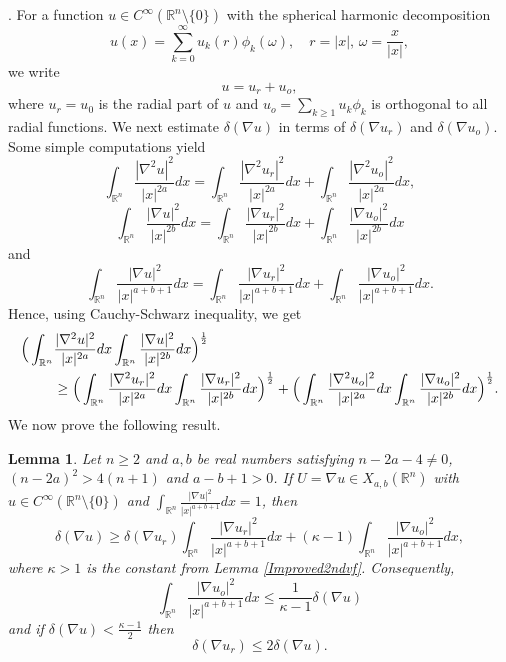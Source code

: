 \documentclass[a4paper,12pt]{article}
\theoremstyle{plain}
\newtheorem{lemma}[theorem]{Lemma}
\theoremstyle{definition}
\theoremstyle{remark}
\def\R{\mathbb R}%
\def\irn{\int_{\R^n}}
\numberwithin{equation}{section}
\begin{document}
. For a function $u \in C^\infty(\R^n\setminus\{0\})$ with the spherical harmonic decomposition
\[
u(x) = \sum_{k=0}^\infty u_k(r) \phi_k(\omega), \quad r = |x|, \, \omega = \frac x{|x|},
\]
we write
\begin{equation}\label{edecomp}
	u = u_r + u_o,
\end{equation}
where $u_r =u_0 $ is the radial part of $u$ and $u_o = \sum_{k\geq 1} u_k \phi_k$ is orthogonal to all radial functions. We next estimate $\delta(\nabla u)$ in terms of $\delta(\nabla u_r)$ and $\delta(\nabla u_o)$. Some simple computations yield
\[
\irn \frac{|\nabla^2 u|^2}{|x|^{2a}} dx = \irn \frac{|\nabla^2 u_r|^2}{|x|^{2a}} dx + \irn \frac{|\nabla^2 u_o|^2}{|x|^{2a}} dx,
\]
\[
\irn \frac{|\nabla u|^2}{|x|^{2b}} dx = \irn \frac{|\nabla u_r|^2}{|x|^{2b}} dx + \irn \frac{|\nabla u_o|^2}{|x|^{2b}} dx
\]
and
\begin{equation}\label{eth11}
	\irn \frac{|\nabla u|^2}{|x|^{a+b+1}} dx = \irn \frac{|\nabla u_r|^2}{|x|^{a+b+1}} dx + \irn \frac{|\nabla u_o|^2}{|x|^{a+b+1}} dx.
\end{equation}
Hence, using  Cauchy-Schwarz inequality, we get
\begin{align}\label{eq:CSineq}
\Big(\irn &\frac{|\nabla^2 u|^2}{|x|^{2a}} dx \irn \frac{|\nabla u|^2}{|x|^{2b}} dx\Big)^{\frac12} \notag\\
&\geq \Big(\irn \frac{|\nabla^2 u_r|^2}{|x|^{2a}} dx \irn \frac{|\nabla u_r|^2}{|x|^{2b}} dx\Big)^{\frac12} + \Big(\irn \frac{|\nabla^2 u_o|^2}{|x|^{2a}} dx \irn \frac{|\nabla u_o|^2}{|x|^{2b}} dx\Big)^{\frac12}.
\end{align}
We now prove  the following result.
\begin{lemma}\label{decompose}
Let $n\geq 2$ and $a, b$ be real numbers satisfying $n-2a -4 \not=0$, $(n-2a)^2 > 4(n+1)$ and $a-b +1 >0$. If $U= \nabla u \in X_{a,b}(\R^n)$ with $u \in C^\infty(\R^n\setminus\{0\})$ and  $\irn \frac{|\nabla u|^2}{|x|^{a+b+1}} dx =1$, then 
\begin{equation}\label{eq:decomp1}
\delta(\nabla u) \geq \delta(\nabla u_r) \irn \frac{|\nabla u_r|^2}{|x|^{a+b+1}} dx + (\kappa -1) \irn \frac{|\nabla u_o|^2}{|x|^{a+b+1}} dx,
\end{equation} 
where $\kappa> 1$ is the constant from Lemma \ref{Improved2ndvf}. Consequently,
\begin{equation}\label{eq:orthpart}
 \irn \frac{|\nabla u_o|^2}{|x|^{a+b+1}} dx \leq \frac{1}{\kappa-1} \delta(\nabla u)
\end{equation}
and if $\delta(\nabla u) < \frac{\kappa -1}2$ then
\begin{equation}\label{eq:radialpart}
\delta(\nabla u_r) \leq 2 \delta(\nabla u).
\end{equation}
\end{lemma}
\end{document}

